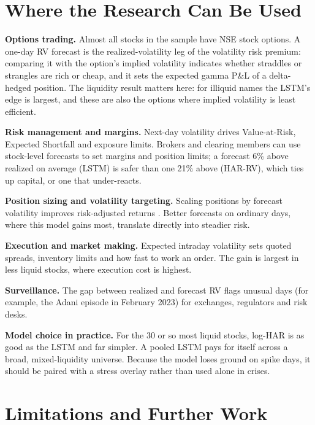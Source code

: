 \documentclass[11pt,a4paper]{article}
\let\oldsection\section
\renewcommand{\section}{\FloatBarrier\needspace{6\baselineskip}\oldsection}
\begin{document}
\section{Where the Research Can Be Used}

\textbf{Options trading.} Almost all stocks in the sample have NSE stock options. A one-day RV forecast
is the realized-volatility leg of the volatility risk premium: comparing it with the option's implied
volatility indicates whether straddles or strangles are rich or cheap, and it sets the expected gamma
P\&L of a delta-hedged position. The liquidity result matters here: for illiquid names the LSTM's edge is
largest, and these are also the options where implied volatility is least efficient.

\textbf{Risk management and margins.} Next-day volatility drives Value-at-Risk, Expected Shortfall and
exposure limits. Brokers and clearing members can use stock-level forecasts to set margins and position
limits; a forecast 6\% above realized on average (LSTM) is safer than one 21\% above (HAR-RV), which ties up
capital, or one that under-reacts.

\textbf{Position sizing and volatility targeting.} Scaling positions by forecast volatility improves
risk-adjusted returns \citep{fleming2001,moreira2017}. Better forecasts on ordinary days, where this
model gains most, translate directly into steadier risk.

\textbf{Execution and market making.} Expected intraday volatility sets quoted spreads, inventory limits
and how fast to work an order. The gain is largest in less liquid stocks, where execution cost is highest.

\textbf{Surveillance.} The gap between realized and forecast RV flags unusual days (for example, the Adani
episode in February 2023) for exchanges, regulators and risk desks.

\textbf{Model choice in practice.} For the 30 or so most liquid stocks, log-HAR is as good as the LSTM and
far simpler. A pooled LSTM pays for itself across a broad, mixed-liquidity universe. Because the model
loses ground on spike days, it should be paired with a stress overlay rather than used alone in crises.

\section{Limitations and Further Work}
\end{document}
